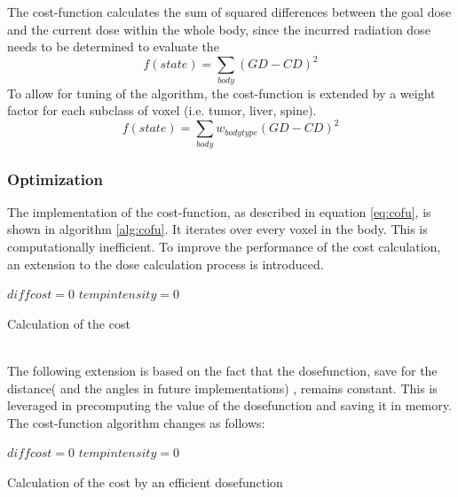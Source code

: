 \documentclass[12pt]{article}
\begin{document}
The cost-function calculates the sum of squared differences between the goal dose and the current dose within the whole body, since the incurred radiation dose needs to be determined to evaluate the 
 \begin{equation}
 f(state) = \sum_{body}(GD-CD)^2
 \end{equation}
 To allow for tuning of the algorithm, the cost-function is extended by a weight factor for each subclass of voxel (i.e. tumor, liver, spine).
 \begin{equation}
 \label{eq:cofu}
 f(state) = \sum_{body}w_{bodytype}(GD-CD)^2
 \end{equation}

\subsubsection{Optimization}
\label{subsubsec:SAoptimization}
The implementation of the cost-function, as described in equation \eqref{eq:cofu}, is shown in algorithm \ref{alg:cofu}. It iterates over every voxel in the body. This is computationally inefficient. To improve the performance of the cost calculation, an extension to the dose calculation process is introduced. \\

\begin{algorithm}[H]
\label{alg:cofu}
 $diffcost=0$\;
 $tempintensity=0$\;
 
 \;
 \caption{Calculation of the cost}
 
 \end{algorithm}
 
 ~\\ The following extension is based on the fact that the dosefunction, save for the distance( and the angles in future implementations) , remains constant. This is leveraged in precomputing the value of the dosefunction and saving it in memory. The cost-function algorithm changes as follows: \\

\begin{algorithm}[H]
\label{alg:cofu2}
 $diffcost=0$\;
 $tempintensity=0$\;
 
 \;
 \caption{Calculation of the cost by an efficient dosefunction}
 
 \end{algorithm}
 
\end{document}
